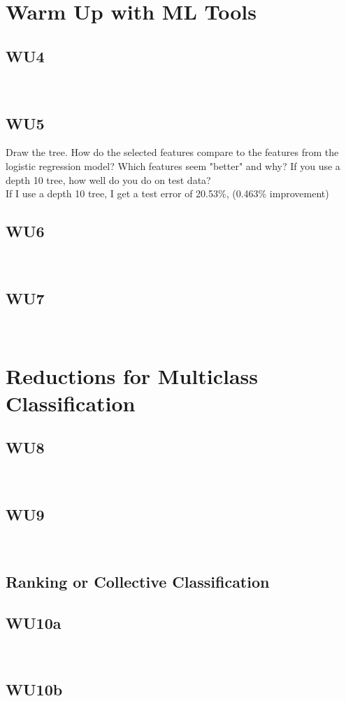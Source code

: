 \documentclass[a4paper,11pt]{article}
\begin{document}
\section{Warm Up with ML Tools}
\label{sec:warmup}
\subsection{WU4}
\textsf{}\\

\subsection{WU5}
\textsf{ Draw the tree. How do the selected features compare to the
  features from the logistic regression model? Which features seem
  "better" and why? If you use a depth 10 tree, how well do you do on
  test data?}\\
If I use a depth 10 tree, I get a test error of 20.53\%, (0.463\% improvement)

\subsection{WU6}
\textsf{}\\

\subsection{WU7}
\textsf{}\\

\section{Reductions for Multiclass Classification}
\subsection{WU8}
\textsf{}\\

\subsection{WU9}
\textsf{}\\

\subsection{Ranking or Collective Classification}
\subsection{WU10a}
\textsf{}\\


\subsection{WU10b}
\textsf{}\\



      
\end{document}
